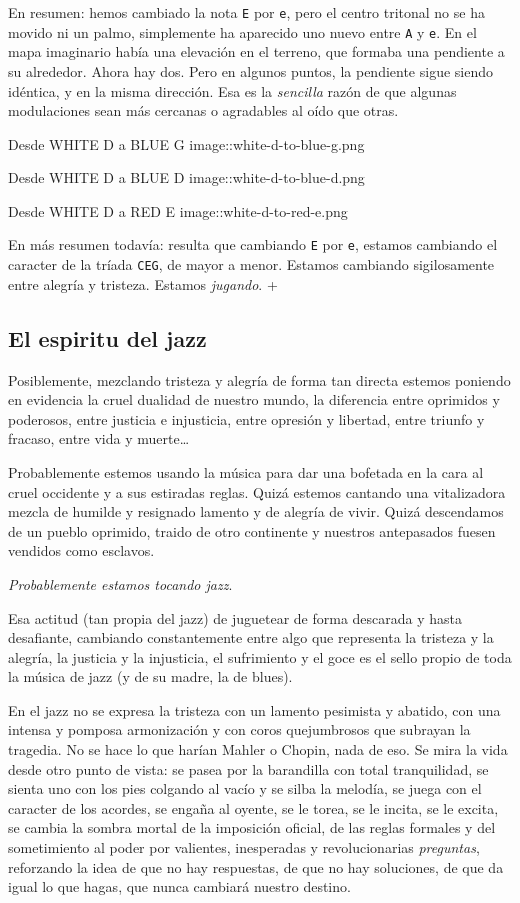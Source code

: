 \documentclass[]{article}
\begin{document}
En resumen: hemos cambiado la nota \texttt{E} por \texttt{e}, pero el centro tritonal no se ha movido ni un palmo, simplemente ha aparecido uno nuevo entre \texttt{A} y \texttt{e}. En el mapa imaginario había una elevación en el terreno, que formaba una pendiente a su alrededor. Ahora hay dos. Pero en algunos puntos, la pendiente sigue siendo idéntica, y en la misma dirección. Esa es la \emph{sencilla} razón de que algunas modulaciones sean más cercanas o agradables al oído que otras.

 Desde WHITE D a BLUE G image::white-d-to-blue-g.png

Desde WHITE D a BLUE D image::white-d-to-blue-d.png

Desde WHITE D a RED E image::white-d-to-red-e.png

En más resumen todavía: resulta que cambiando \texttt{E} por \texttt{e}, estamos cambiando el caracter de la tríada \texttt{CEG}, de mayor a menor. Estamos cambiando sigilosamente entre alegría y tristeza. Estamos \emph{jugando}. +

\subsection{El espiritu del jazz}

Posiblemente, mezclando tristeza y alegría de forma tan directa estemos poniendo en evidencia la cruel dualidad de nuestro mundo, la diferencia entre oprimidos y poderosos, entre justicia e injusticia, entre opresión y libertad, entre triunfo y fracaso, entre vida y muerte\ldots{}

Probablemente estemos usando la música para dar una bofetada en la cara al cruel occidente y a sus estiradas reglas. Quizá estemos cantando una vitalizadora mezcla de humilde y resignado lamento y de alegría de vivir. Quizá descendamos de un pueblo oprimido, traido de otro continente y nuestros antepasados fuesen vendidos como esclavos.

\emph{Probablemente estamos tocando jazz}.

Esa actitud (tan propia del jazz) de juguetear de forma descarada y hasta desafiante, cambiando constantemente entre algo que representa la tristeza y la alegría, la justicia y la injusticia, el sufrimiento y el goce es el sello propio de toda la música de jazz (y de su madre, la de blues).

En el jazz no se expresa la tristeza con un lamento pesimista y abatido, con una intensa y pomposa armonización y con coros quejumbrosos que subrayan la tragedia. No se hace lo que harían Mahler o Chopin, nada de eso. Se mira la vida desde otro punto de vista: se pasea por la barandilla con total tranquilidad, se sienta uno con los pies colgando al vacío y se silba la melodía, se juega con el caracter de los acordes, se engaña al oyente, se le torea, se le incita, se le excita, se cambia la sombra mortal de la imposición oficial, de las reglas formales y del sometimiento al poder por valientes, inesperadas y revolucionarias \emph{preguntas}, reforzando la idea de que no hay respuestas, de que no hay soluciones, de que da igual lo que hagas, que nunca cambiará nuestro destino.
\end{document}
